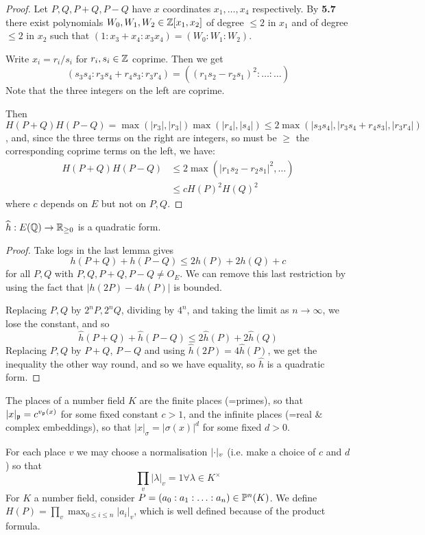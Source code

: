 \documentclass[10pt,a4paper]{article}
\begin{document}
\begin{proof}
  Let $P,Q,P+Q,P-Q$ have $x$ coordinates $x_1, \ldots, x_4$ respectively. By \textbf{5.7} there exist polynomials $W_0, W_1, W_2 \in \Z[x_1,x_2]$ of degree $\leq 2$ in $x_1$ and of degree $\leq 2$ in $x_2$ such that $(1:x_3+x_4:x_3x_4) = (W_0:W_1:W_2)$.

  Write $x_i = r_i/s_i$ for $r_i, s_i \in \Z$ coprime. Then we get
  \[(s_3s_4:r_3s_4+r_4s_3:r_3r_4) = ((r_1s_2-r_2s_1)^2:\ldots:\ldots)\]
  Note that the three integers on the left are coprime.

  Then $H(P+Q)H(P-Q) = \max(|r_3|,|r_3|)\max(|r_4|,|s_4|) \leq 2\max(|s_3s_4|,|r_3s_4+r_4s_3|,|r_3r_4|)$, and, since the three terms on the right are integers, so must be $\geq$ the corresponding coprime terms on the left, we have:
  \begin{align*}
    H(P+Q)H(P-Q) & \leq 2 \max(|r_1s_2-r_2s_1|^2, \ldots)\\
    &\leq c H(P)^2 H(Q)^2
  \end{align*}
  where $c$ depends on $E$ but not on $P,Q$.
\end{proof}
\begin{theorem}
  $\hat{h}:E(\Q) \to \R_{\geq 0}$ is a quadratic form.
\end{theorem}
\begin{proof}
  Take logs in the last lemma gives
  \[h(P+Q) + h(P-Q) \leq 2h(P)+2h(Q) + c\]
  for all $P,Q$ with $P,Q,P+Q,P-Q \neq O_E$. We can remove this last restriction by using the fact that $|h(2P)-4h(P)|$ is bounded.

  Replacing $P,Q$ by $2^nP, 2^nQ$, dividing by $4^n$, and taking the limit as $n \to \infty$, we lose the constant, and so
  \[\hat{h}(P+Q)+\hat{h}(P-Q) \leq 2\hat{h}(P)+2\hat{h}(Q)\]
  Replacing $P, Q$ by $P+Q$, $P-Q$ and using $\hat{h}(2P) = 4\hat{h}(P)$, we get the inequality the other way round, and so we have equality, so $\hat{h}$ is a quadratic form.
\end{proof}
The places of a number field $K$ are the finite places (=primes), so that $|x|_\p = c^{v_\p(x)}$ for some fixed constant $c>1$, and the infinite places (=real \& complex embeddings), so that $|x|_\sigma = |\sigma(x)|^d$ for some fixed $d>0$.

For each place $v$ we may choose a normalisation $\abs{\cdot}_v$ (i.e. make a choice of $c$ and $d$) so that
\[\prod_v |\lambda|_v = 1 \forall \lambda \in K^\times\]
For $K$ a number field, consider $P = (a_0:a_1:\ldots :a_n)\in\P^n(K)$. We define $H(P ) = \prod_v \max_{0 \leq i\leq n} |a_i|_v$, which is well defined because of the product formula.
\end{document}
